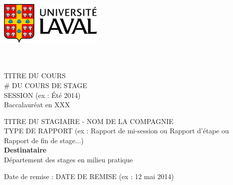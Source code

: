 \documentclass[12pt]{article} 	%
\begin{document}
\thispagestyle{empty}
		\begin{minipage}[t]{8.5cm}
			\vspace{0pt}
			\begin{flushleft}
				\hspace{-1cm}\includegraphics[width=5cm]{img/ulaval_logo.jpg}\\
				\\[-0.2cm]

			\end{flushleft}
		\end{minipage}
		\begin{minipage}[t]{8.5cm}
				\begin{flushright}		
						\hspace*{2cm} \\
						\hspace*{1cm}TITRE DU COURS \\
						\hspace*{1cm}\# DU COURS DE STAGE\\
						\hspace*{1cm}SESSION (ex : Été 2014)\\
						\hspace*{1cm}Baccalauréat en XXX\\
				\end{flushright}		
		\end{minipage}

\vspace{4cm}
\begin{center}
	\large TITRE DU STAGIAIRE - NOM DE LA COMPAGNIE \\
	\vspace{1cm}
	\large TYPE DE RAPPORT (ex : Rapport de mi-session ou Rapport d'étape ou Rapport de fin de stage...)\\

	\vspace{5cm}
	\fontsize{15}{15}\textbf {Destinataire}\\

	\vspace{0.5cm}
	\large Département des stages en milieu pratique \\

\end{center}
\vspace{3cm}
\begin{flushleft}
	Date de remise : DATE DE REMISE (ex : 12 mai 2014)
\end{flushleft}
\end{document}

